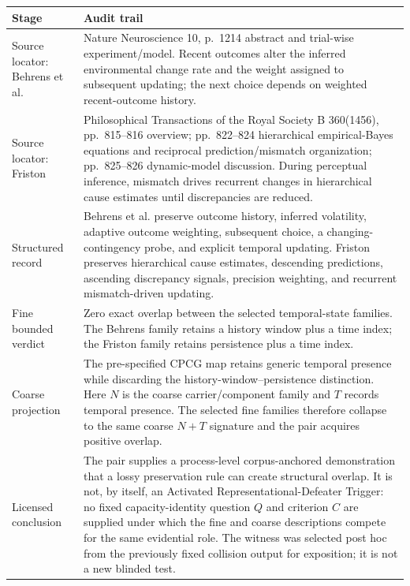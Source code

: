 \documentclass[11pt]{article}
\begin{document}
\begingroup
\small
\begin{tabularx}{\textwidth}{>{\raggedright\arraybackslash}p{} X}
\toprule
Stage & Audit trail \\
\midrule
Source locator: Behrens et al. & Nature Neuroscience 10, p.~1214 abstract and trial-wise experiment/model. Recent outcomes alter the inferred environmental change rate and the weight assigned to subsequent updating; the next choice depends on weighted recent-outcome history. \\
Source locator: Friston & Philosophical Transactions of the Royal Society B 360(1456), pp.~815--816 overview; pp.~822--824 hierarchical empirical-Bayes equations and reciprocal prediction/mismatch organization; pp.~825--826 dynamic-model discussion. During perceptual inference, mismatch drives recurrent changes in hierarchical cause estimates until discrepancies are reduced. \\
Structured record & Behrens et al. preserve outcome history, inferred volatility, adaptive outcome weighting, subsequent choice, a changing-contingency probe, and explicit temporal updating. Friston preserves hierarchical cause estimates, descending predictions, ascending discrepancy signals, precision weighting, and recurrent mismatch-driven updating. \\
Fine bounded verdict & Zero exact overlap between the selected temporal-state families. The Behrens family retains a history window plus a time index; the Friston family retains persistence plus a time index. \\
Coarse projection & The pre-specified CPCG map retains generic temporal presence while discarding the history-window--persistence distinction. Here \(N\) is the coarse carrier/component family and \(T\) records temporal presence. The selected fine families therefore collapse to the same coarse \(N+T\) signature and the pair acquires positive overlap. \\
Licensed conclusion & The pair supplies a process-level corpus-anchored demonstration that a lossy preservation rule can create structural overlap. It is not, by itself, an Activated Representational-Defeater Trigger: no fixed capacity-identity question \(Q\) and criterion \(C\) are supplied under which the fine and coarse descriptions compete for the same evidential role. The witness was selected post hoc from the previously fixed collision output for exposition; it is not a new blinded test. \\
\bottomrule
\end{tabularx}
\endgroup
\end{document}
